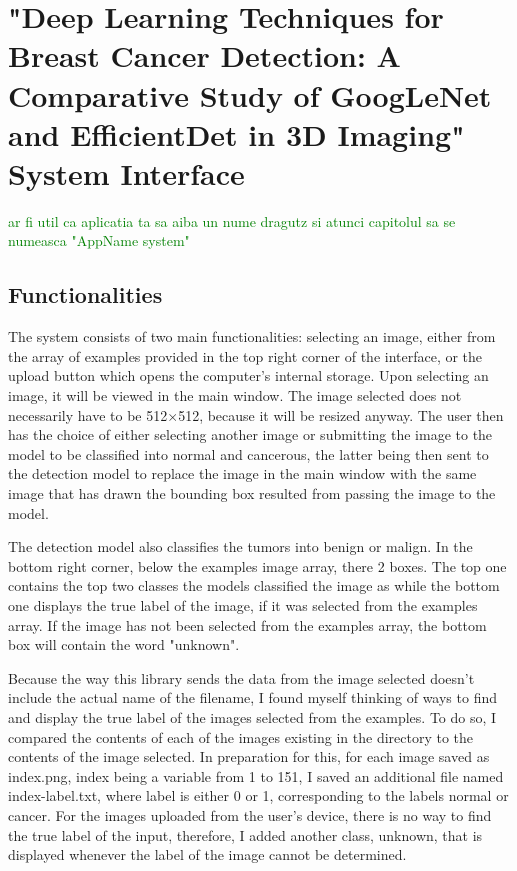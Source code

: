 \chapter[Intelligent System]{"Deep Learning Techniques for Breast Cancer Detection: A Comparative Study of GoogLeNet and EfficientDet in 3D Imaging" System Interface}
\label{chap:ch5}

\textcolor{green}{ar fi util ca aplicatia ta sa aiba un nume dragutz si atunci capitolul sa se numeasca "AppName system"}
\section{Functionalities}
The system consists of two main functionalities: selecting an image, either from the array of examples provided in the top right corner of the interface, or the upload button which opens the computer's internal storage. Upon selecting an image, it will be viewed in the main window. The image selected does not necessarily have to be 512$\times$512, because it will be resized anyway. The user then has the choice of either selecting another image or submitting the image to the model to be classified into normal and cancerous, the latter being then sent to the detection model to replace the image in the main window with the same image that has drawn the bounding box resulted from passing the image to the model. 

The detection model also classifies the tumors into benign or malign. In the bottom right corner, below the examples image array, there 2 boxes. The top one contains the top two classes the models classified the image as while the bottom one displays the true label of the image, if it was selected from the examples array. If the image has not been selected from the examples array, the bottom box will contain the word "unknown".

Because the way this library sends the data from the image selected doesn't include the actual name of the filename, I found myself thinking of ways to find and display the true label of the images selected from the examples. To do so, I compared the contents of each of the images existing in the directory to the contents of the image selected. In preparation for this, for each image saved as index.png, index being a variable from 1 to 151, I saved an additional file named index-label.txt, where label is either 0 or 1, corresponding to the labels normal or cancer. For the images uploaded from the user's device, there is no way to find the true label of the input, therefore, I added another class, unknown, that is displayed whenever the label of the image cannot be determined.

